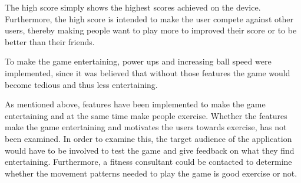The high score simply shows the highest scores achieved on the device.
Furthermore, the high score is intended to make the user compete against other users, thereby making people want to play more to improved their score or to be better than their friends.

To make the game entertaining, power ups and increasing ball speed were implemented, since it was believed that without those features the game would become tedious and thus less entertaining. 

As mentioned above, features have been implemented to make the game entertaining and at the same time make people exercise.
Whether the features make the game entertaining and motivates the users towards exercise, has not been examined.
In order to examine this, the target audience of the application would have to be involved to test the game and give feedback on what they find entertaining.
Furthermore, a fitness consultant could be contacted to determine whether the movement patterns needed to play the game is good exercise or not.




